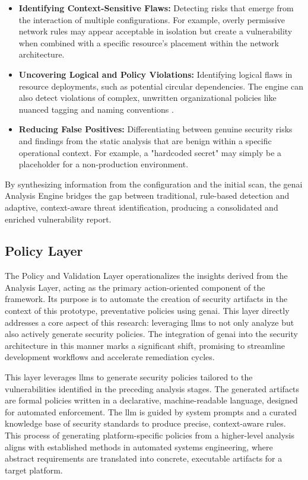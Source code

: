 \begin{itemize}
\item \textbf{Identifying Context-Sensitive Flaws:} Detecting risks that emerge from the interaction of multiple configurations. For example, overly permissive network rules may appear acceptable in isolation but create a vulnerability when combined with a specific resource's placement within the network architecture\cite{zhang_empirical_2024}.
\item \textbf{Uncovering Logical and Policy Violations:} Identifying logical flaws in resource deployments, such as potential circular dependencies. The engine can also detect violations of complex, unwritten organizational policies like nuanced tagging and naming conventions \cite{khanna_enhancing_2024}.
\item \textbf{Reducing False Positives:} Differentiating between genuine security risks and findings from the static analysis that are benign within a specific operational context. For example, a "hardcoded secret" may simply be a placeholder for a non-production environment.
\end{itemize}

By synthesizing information from the configuration and the initial scan, the \gls{genai} Analysis Engine bridges the gap between traditional, rule-based detection and adaptive, context-aware threat identification, producing a consolidated and enriched vulnerability report.

\subsection{Policy Layer}
\label{subsec:policy-layer}

The Policy and Validation Layer operationalizes the insights derived from the Analysis Layer, acting as the primary action-oriented component of the framework. Its purpose is to automate the creation of security artifacts in the context of this prototype, preventative policies using \gls{genai}. This layer directly addresses a core aspect of this research: leveraging \glspl{llm} to not only analyze but also actively generate security policies. The integration of \gls{genai} into the security architecture in this manner marks a significant shift, promising to streamline development workflows and accelerate remediation cycles.

This layer leverages \glspl{llm} to generate security policies tailored to the vulnerabilities identified in the preceding analysis stages. The generated artifacts are formal policies written in a declarative, machine-readable language, designed for automated enforcement. The \gls{llm} is guided by system prompts and a curated knowledge base of security standards to produce precise, context-aware rules. This process of generating platform-specific policies from a higher-level analysis aligns with established methods in automated systems engineering, where abstract requirements are translated into concrete, executable artifacts for a target platform\cite{fakih_llm4cve_2025}.

